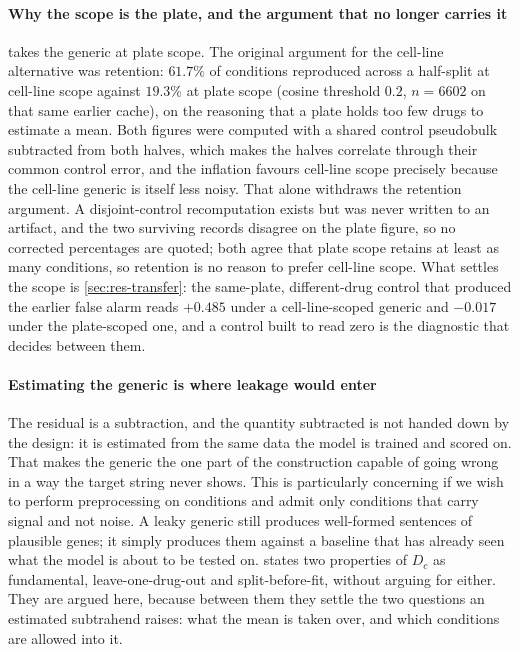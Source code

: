 \paragraph{Why the scope is the plate, and the argument that no longer carries
it}  takes the generic at plate scope. The original
argument for the cell-line alternative was retention: $61.7\%$ of conditions
reproduced across a half-split at cell-line scope against $19.3\%$ at plate
scope (cosine threshold $0.2$, $n = 6602$ on that same earlier cache), on the reasoning that a plate holds
too few drugs to estimate a mean.
Both figures were computed with a shared control pseudobulk subtracted from both
halves, which makes the halves correlate through their common control error, and
the inflation favours cell-line scope precisely because the cell-line generic is
itself less noisy. That alone withdraws the retention argument. A
disjoint-control recomputation exists but was never written to an artifact, and
the two surviving records disagree on the plate figure, so no corrected
percentages are quoted; both agree that plate scope retains at least as many
conditions, so retention is no reason to prefer cell-line scope. What settles
the scope is \cref{sec:res-transfer}: the same-plate, different-drug control
that produced the earlier false alarm reads $+0.485$ under a cell-line-scoped
generic and $-0.017$ under the plate-scoped one, and a control built to read
zero is the diagnostic that decides between them.

\paragraph{Estimating the generic is where leakage would enter} The residual is a
subtraction, and the quantity subtracted is not handed down by the design: it is
estimated from the same data the model is trained and scored on. That makes the
generic the one part of the construction capable of going wrong in a way the
target string never shows. This is particularly concerning if we wish to perform preprocessing on conditions and admit only conditions that carry signal and not noise. A leaky generic still produces well-formed sentences of
plausible genes; it simply produces them against a baseline that has already seen
what the model is about to be tested on.  states two
properties of $D_c$ as fundamental, leave-one-drug-out and split-before-fit,
without arguing for either. They are argued here, because between them they settle
the two questions an estimated subtrahend raises: what the mean is taken over, and
which conditions are allowed into it.

